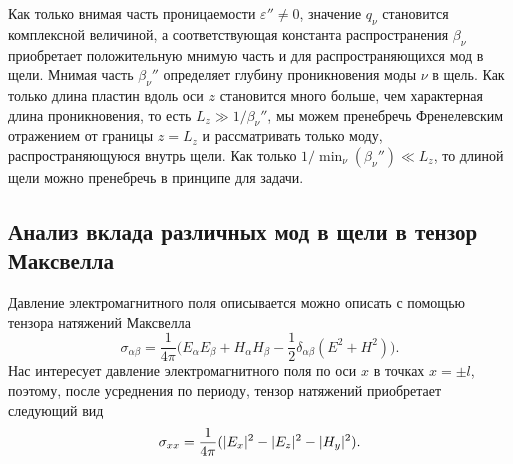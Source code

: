  Как только внимая часть проницаемости $\varepsilon'' \neq 0$, значение $q_\nu$ становится комплексной величиной, а соответствующая константа 
 распространения $\beta_\nu$ приобретает положительную мнимую часть и для распространяющихся мод в щели. Мнимая часть $\beta_\nu''$ определяет
 глубину проникновения моды $\nu$ в щель. Как только длина пластин вдоль оси $z$ становится много больше, чем характерная длина проникновения, то 
 есть $L_z \gg 1/\beta_\nu''$, мы можем пренебречь Френелевским отражением от границы $z = L_z$ и рассматривать только моду, распространяющуюся внутрь щели.  Как только $1/\min_{\nu}(\beta_\nu'') \ll L_z$,
 то длиной щели можно пренебречь в принципе для задачи. 

\subsection{Анализ вклада различных мод в щели в тензор Максвелла}

Давление электромагнитного поля описывается можно описать с помощью тензора натяжений Максвелла \begin{equation*}
    \sigma_{\alpha \beta} = \frac{1}{4 \pi}\Big( E_\alpha E_\beta + H_\alpha H_\beta - \frac{1}{2}\delta_{\alpha \beta}(E^2 + H^2) \Big).
\end{equation*} Нас интересует давление электромагнитного поля по оси $x$ в точках $x = \pm l$, поэтому, после усреднения по периоду, тензор натяжений приобретает следующий вид
\begin{equation}
    \sigma_{xx} = \frac{1}{4 \pi} (\lvert E_x\rvert^2 -\lvert E_z\rvert^2 - \lvert H_y\rvert^2).
\end{equation}

